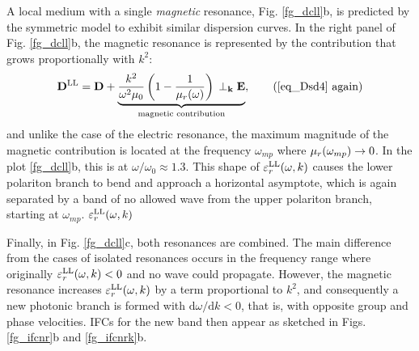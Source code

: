 A local medium with a single \textit{magnetic} resonance, Fig. \ref{fg_dcll}b, is predicted by the symmetric model to exhibit similar dispersion curves. In the right panel of Fig. \ref{fg_dcll}b, the magnetic resonance is represented by the
contribution that grows proportionally with $k^2$: 
\begin{equation} \Dsd = \D + \underbrace{\frac{k^2}{\omega^2 \mu_0}\left(1 - \frac{1}{\murl(\omega)}\right) \, \TT \E}_{\text{magnetic contribution}},      \tag{\ref{eq_Dsd4} \again} \end{equation}
and unlike the case of the electric resonance, the maximum magnitude of the magnetic contribution is located at the frequency $\omega_{mp}$ where $\mu_r(\omega_{mp}) \rightarrow 0$. In the plot \ref{fg_dcll}b, this is at $\omega/\omega_0 \approx 1.3$.
This shape of $\varepsilon_r^\text{LL}(\omega, k)$ causes the lower polariton branch to bend and approach a horizontal asymptote, which is again separated by a band of no allowed wave from the upper polariton branch, starting at $\omega_{mp}$.
$\varepsilon_r^\text{LL}(\omega, k)$

Finally, in Fig. \ref{fg_dcll}c, both resonances are combined. The main difference from the cases of isolated resonances occurs in the frequency range where originally $\varepsilon_r^\text{LL}(\omega, k) < 0$ and no wave could propagate. However, the magnetic resonance increases $\varepsilon_r^\text{LL}(\omega, k)$ by a term proportional to $k^2$, and consequently a new photonic branch is formed with $\mathrm{d}\omega/\mathrm{d}k < 0$, that is, with opposite group and phase velocities. IFCs for the new band then appear as sketched in Figs. \ref{fg_ifcnr}b and \ref{fg_ifcnrk}b.



